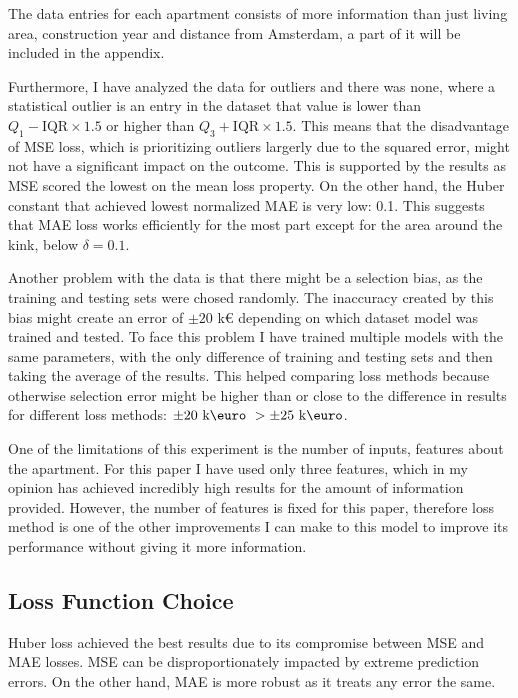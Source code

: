 \documentclass{article}
\begin{document}
The data entries for each apartment consists of more information than just
living area, construction year and distance from Amsterdam, a part of it will
be included in the appendix.


Furthermore, I have analyzed the data for outliers and there was none, where a
statistical outlier is an entry in the dataset that value is lower than
$Q_1 - \mathrm{IQR} \times 1.5$ or higher than $Q_3 + \mathrm{IQR} \times 1.5$.
This means that the disadvantage of MSE loss, which is prioritizing outliers
largerly due to the squared error, might not have a significant impact on
the outcome. This is supported by the results as MSE scored the lowest on the
mean loss property. On the other hand, the Huber constant that achieved lowest
normalized MAE is very low: 0.1. This suggests that MAE loss works efficiently
for the most part except for the area around the kink, below $\delta = 0.1$.


Another problem with the data is that there might be a selection bias, as the
training and testing sets
were chosed randomly. The inaccuracy created by this bias might create an error
of $\pm 20$ k{\euro} depending on which dataset model was trained and tested.
To face this problem I have trained multiple models with the same parameters, with
the only difference of training and testing sets and then taking the average of
the results. This helped comparing loss methods because otherwise selection error
might be higher than or close to the difference in results for different
loss methods: $\pm 20 \text{ k\euro } > \pm 25 \text{ k\euro}$.


One of the limitations of this experiment is the number of inputs, features about
the apartment. For this paper I have used only three features, which in my opinion
has achieved incredibly high results for the amount of information provided.
However, the number of features is fixed for this paper, therefore loss method is
one of the other improvements I can make to this model to improve its performance
without giving it more information.


\subsection{Loss Function Choice}

Huber loss achieved the best results due to its compromise between MSE and MAE losses.
MSE can be disproportionately impacted by extreme prediction errors. On the other
hand, MAE is more robust as it treats any error the same.
\end{document}
